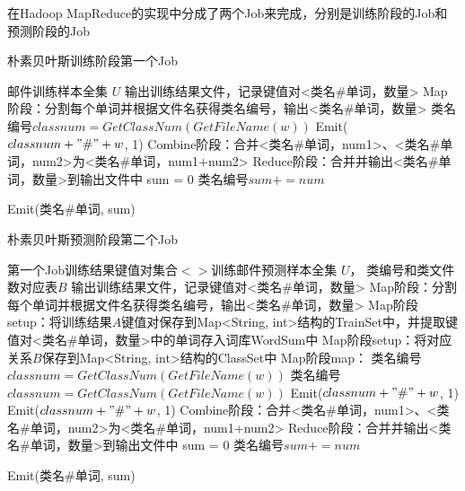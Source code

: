 \documentclass[lang=cn,11pt]{elegantpaper}
\begin{document}
在Hadoop MapReduce的实现中分成了两个Job来完成，分别是训练阶段的Job和预测阶段的Job
\begin{algorithm}[htb]
  \caption{朴素贝叶斯训练阶段第一个Job}
  \label{alg:Framwork}
  \begin{algorithmic}[1]
    \Require
    邮件训练样本全集 $U$
    \Ensure
    输出训练结果文件，记录键值对<类名\#单词，数量>
    \State Map阶段：分割每个单词并根据文件名获得类名编号，输出<类名\#单词，数量>
      \State 类名编号$classnum = GetClassNum(GetFileName(w))$
      \State Emit($classnum + "\#" + w$, 1)
   \EndFor
	\State Combine阶段：合并<类名\#单词，num1>、<类名\#单词，num2>为<类名\#单词，num1+num2>
    \State Reduce阶段：合并并输出<类名\#单词，数量>到输出文件中
    \State sum = 0
      \State 类名编号$sum += num$

   \EndFor
	\State Emit(类名\#单词, sum)
  \end{algorithmic}
\end{algorithm}

\begin{algorithm}[htb]
  \caption{朴素贝叶斯预测阶段第二个Job}
  \label{alg:Framwork}
  \begin{algorithmic}[1]
    \Require
    第一个Job训练结果键值对集合$<>$训练邮件预测样本全集 $U$， 类编号和类文件数对应表$B$
    \Ensure
    输出训练结果文件，记录键值对<类名\#单词，数量>
    \State Map阶段：分割每个单词并根据文件名获得类名编号，输出<类名\#单词，数量>
	\State Map阶段setup：将训练结果$A$键值对保存到Map<String, int>结构的TrainSet中，并提取键值对<类名\#单词，数量>中的单词存入词库WordSum中
	\State Map阶段setup：将对应关系$B$保存到Map<String, int>结构的ClassSet中
	\State Map阶段map：
      \State 类名编号$classnum = GetClassNum(GetFileName(w))$
      		\State 类名编号$classnum = GetClassNum(GetFileName(w))$
      		\State Emit($classnum + "\#" + w$, 1)
   			\EndFor
      \State Emit($classnum + "\#" + w$, 1)
   \EndFor
	\State Combine阶段：合并<类名\#单词，num1>、<类名\#单词，num2>为<类名\#单词，num1+num2>
    \State Reduce阶段：合并并输出<类名\#单词，数量>到输出文件中
    \State sum = 0
      \State 类名编号$sum += num$

   \EndFor
	\State Emit(类名\#单词, sum)
  \end{algorithmic}
\end{algorithm}
\end{document}
